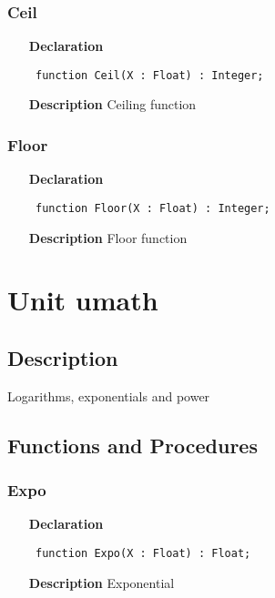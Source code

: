 \documentclass[12pt,a4paper,oneside]{report}
\newcommand{\declarationitem}[1]{\textbf{#1}}
\newcommand{\descriptiontitle}[1]{\textbf{#1}}
\newcommand{\code}[1]{\texttt{#1}}
\begin{document}
\subsubsection{Ceil}
\label{uround-Ceil}
\begin{itemize}\item[\declarationitem{Declaration}\hfill]
	\begin{flushleft}
		\code{
			function Ceil(X : Float) : Integer;}
		
	\end{flushleft}
	
	\par
	\item[\descriptiontitle{Description}]
	Ceiling function
	
\end{itemize}
\subsubsection{Floor}
\label{uround-Floor}
\begin{itemize}\item[\declarationitem{Declaration}\hfill]
	\begin{flushleft}
		\code{
			function Floor(X : Float) : Integer;}
		
	\end{flushleft}
	
	\par
	\item[\descriptiontitle{Description}]
	Floor function
	
\end{itemize}
\section{Unit umath}
\label{umath}
\subsection{Description}
Logarithms, exponentials and power 
\subsection{Functions and Procedures}
\subsubsection{Expo}
\label{umath-Expo}
\begin{itemize}\item[\declarationitem{Declaration}\hfill]
	\begin{flushleft}
		\code{
			function Expo(X : Float) : Float;}
		
	\end{flushleft}
	
	\par
	\item[\descriptiontitle{Description}]
	Exponential
	
\end{itemize}
\end{document}
